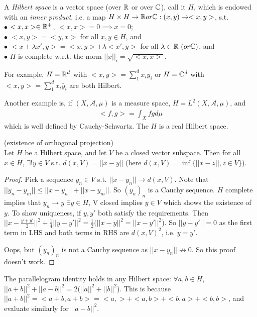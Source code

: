\documentclass[a4paper]{article}
\begin{document}
A \emph{Hilbert space} is a vector space (over $\mathbb{R}$ or over $\mathbb{C}$), call it $H$, which is endowed with an \emph{inner product}, i.e. a map $H \times H \to \mathbb{R} or \mathbb{C}: (x,y) \to <x,y>$, s.t.\\ 
$\bullet$ $<x,x> \in \mathbb{R}^+$, $<x,x> = 0 \implies x=0$;\\
$\bullet$ $<x,y> = <y,x>$ for all $x,y \in H$, and\\
$\bullet$ $<x+\lambda x',y> = <x,y> + \lambda<x',y>$ for all $\lambda \in \mathbb{R} \ ( or \mathbb{C})$, and\\
$\bullet$ $H$ is complete w.r.t. the norm $||x||_i = \sqrt{<x,x>}$.

For example, $H = \mathbb{R}^d$ with $<x,y> = \sum_1^d x_iy_i$ or $H = \mathbb{C}^d$ with $<x,y> = \sum_1^d x_i \bar{y}_i$ are both Hilbert.

Another example is, if $(X,\mathcal{A},\mu)$ is a measure space, $H = L^2 (X,\mathcal{A},\mu)$, and
\begin{equation*}
\begin{aligned}
<f,g> =\int_X fg d\mu
\end{aligned}
\end{equation*}
which is well defined by Cauchy-Schwartz. The $H$ is a real Hilbert space.

\begin{lemma} (existence of orthogonal projection)\\
Let $H$ be a Hilbert space, and let $V$ be a closed vector subspace. Then for all $x \in H$, $\exists! y \in V$ s.t. $d(x,V) = ||x-y||$ (here $d(x,V) = \inf \{||x-z||,z \in V\}$).
\begin{proof}
Pick a sequence $y_n \in V$ s.t. $||x-y_n|| \to d(x,V)$. Note that $||y_n - y_m|| \leq ||x-y_n|| + ||x-y_m||$. So $(y_n)_n$ is a Cauchy sequence. $H$ complete implies that $y_n \to y$ $\exists y \in H$, V closed implies $y \in V$ which shows the existence of $y$. To show uniqueness, if $y,y'$ both satisfy the requirements. Then $||x-\frac{y+y'}{2}||^2 + \frac{1}{4}||y-y'||^2 = \frac{1}{2}(||x-y||^2 = ||x-y'||^2$). So $||y-y'|| = 0$ as the first term in LHS and both terms in RHS are $d(x,V)^2$, i.e. $y = y'$.

Oops, but $(y_n)_n$ is not a Cauchy sequence as $||x-y_n|| \not\to 0$. So this proof doesn't work.
\end{proof}
\end{lemma}

\begin{rem}
The parallelogram identity holds in any Hilbert space: $\forall a,b \in H$, $||a+b||^2 + ||a-b||^2 = 2(||a||^2+||b||^2$). This is because $||a+b||^2 = <a+b,a+b> = <a,>+<a,b>+<b,a>+<b,b>$, and evaluate similarly for $||a-b||^2$.
\end{rem}
\end{document}
